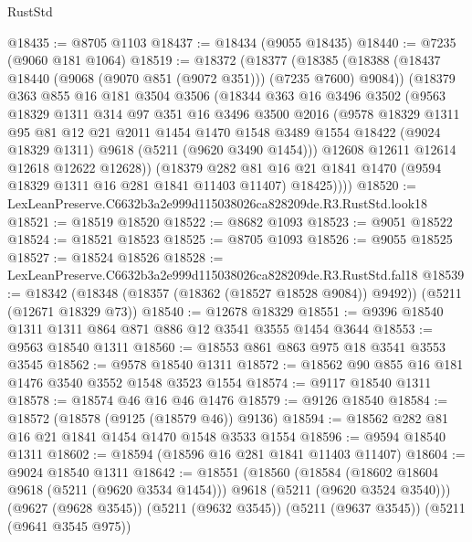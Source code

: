 \begin{lexlean}{RustStd}
\begin{coremodule}
@18435 := @8705 @1103
@18437 := @18434 (@9055 @18435)
@18440 := @7235 (@9060 @181 @1064)
@18519 := @18372
    (@18377
      (@18385
        (@18388 (@18437 @18440 (@9068 (@9070 @851 (@9072 @351))) (@7235 @7600) @9084))
        (@18379
          @363
          @855
          @16
          @181
          @3504
          @3506
          (@18344
            @363
            @16
            @3496
            @3502
            (@9563
              @18329
              @1311
              @314
              @97
              @351
              @16
              @3496
              @3500
              @2016
              (@9578
                @18329
                @1311
                @95
                @81
                @12
                @21
                @2011
                @1454
                @1470
                @1548
                @3489
                @1554
                @18422
                (@9024 @18329 @1311)
                @9618
                (@5211 (@9620 @3490 @1454)))
              @12608
              @12611
              @12614
              @12618
              @12622
              @12628))
          (@18379
            @282
            @81
            @16
            @21
            @1841
            @1470
            (@9594 @18329 @1311 @16 @281 @1841 @11403 @11407)
            @18425))))
@18520 := LexLeanPreserve.C6632b3a2e999d115038026ca828209de.R3.RustStd.look18
@18521 := @18519 @18520
@18522 := @8682 @1093
@18523 := @9051 @18522
@18524 := @18521 @18523
@18525 := @8705 @1093
@18526 := @9055 @18525
@18527 := @18524 @18526
@18528 := LexLeanPreserve.C6632b3a2e999d115038026ca828209de.R3.RustStd.fal18
@18539 := @18342 (@18348 (@18357 (@18362 (@18527 @18528 @9084)) @9492)) (@5211 (@12671 @18329 @73))
@18540 := @12678 @18329
@18551 := @9396 @18540 @1311 @1311 @864 @871 @886 @12 @3541 @3555 @1454 @3644
@18553 := @9563 @18540 @1311
@18560 := @18553 @861 @863 @975 @18 @3541 @3553 @3545
@18562 := @9578 @18540 @1311
@18572 := @18562 @90 @855 @16 @181 @1476 @3540 @3552 @1548 @3523 @1554
@18574 := @9117 @18540 @1311
@18578 := @18574 @46 @16 @46 @1476
@18579 := @9126 @18540
@18584 := @18572 (@18578 (@9125 (@18579 @46)) @9136)
@18594 := @18562 @282 @81 @16 @21 @1841 @1454 @1470 @1548 @3533 @1554
@18596 := @9594 @18540 @1311
@18602 := @18594 (@18596 @16 @281 @1841 @11403 @11407)
@18604 := @9024 @18540 @1311
@18642 := @18551
    (@18560
      (@18584 (@18602 @18604 @9618 (@5211 (@9620 @3534 @1454))) @9618 (@5211 (@9620 @3524 @3540)))
      (@9627 (@9628 @3545))
      (@5211 (@9632 @3545))
      (@5211 (@9637 @3545))
      (@5211 (@9641 @3545 @975))

\end{coremodule}
\end{lexlean}
